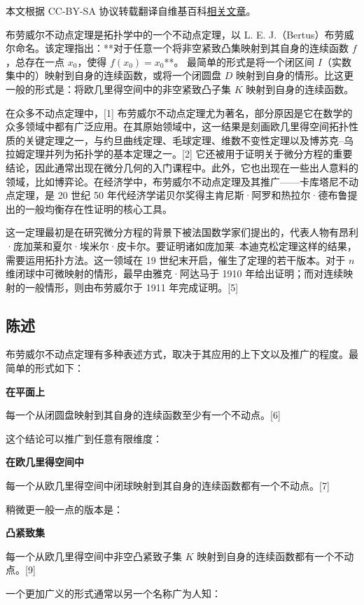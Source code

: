 
本文根据 CC-BY-SA 协议转载翻译自维基百科\href{https://en.wikipedia.org/wiki/Brouwer_fixed-point_theorem}{相关文章}。

布劳威尔不动点定理是拓扑学中的一个不动点定理，以 L. E. J.（Bertus）布劳威尔命名。该定理指出：**对于任意一个将非空紧致凸集映射到其自身的连续函数 $f$，总存在一点 $x_0$，使得 $f(x_0) = x_0$**。
最简单的形式是将一个闭区间 $I$（实数集中的）映射到自身的连续函数，或将一个闭圆盘 $D$ 映射到自身的情形。比这更一般的形式是：将欧几里得空间中的非空紧致凸子集 $K$ 映射到自身的连续函数。

在众多不动点定理中，[1] 布劳威尔不动点定理尤为著名，部分原因是它在数学的众多领域中都有广泛应用。在其原始领域中，这一结果是刻画欧几里得空间拓扑性质的关键定理之一，与约旦曲线定理、毛球定理、维数不变性定理以及博苏克–乌拉姆定理并列为拓扑学的基本定理之一。[2] 它还被用于证明关于微分方程的重要结论，因此通常出现在微分几何的入门课程中。此外，它也出现在一些出人意料的领域，比如博弈论。在经济学中，布劳威尔不动点定理及其推广——卡库塔尼不动点定理，是 20 世纪 50 年代经济学诺贝尔奖得主肯尼斯·阿罗和热拉尔·德布鲁提出的一般均衡存在性证明的核心工具。

这一定理最初是在研究微分方程的背景下被法国数学家们提出的，代表人物有昂利·庞加莱和夏尔·埃米尔·皮卡尔。要证明诸如庞加莱–本迪克松定理这样的结果，需要运用拓扑方法。这一领域在 19 世纪末开启，催生了定理的若干版本。对于 $n$ 维闭球中可微映射的情形，最早由雅克·阿达马于 1910 年给出证明；而对连续映射的一般情形，则由布劳威尔于 1911 年完成证明。[5]
\subsection{陈述}
布劳威尔不动点定理有多种表述方式，取决于其应用的上下文以及推广的程度。最简单的形式如下：

\textbf{在平面上}

每一个从闭圆盘映射到其自身的连续函数至少有一个不动点。[6]

这个结论可以推广到任意有限维度：

\textbf{在欧几里得空间中}

每一个从欧几里得空间中闭球映射到其自身的连续函数都有一个不动点。[7]

稍微更一般一点的版本是：

\textbf{凸紧致集}

每一个从欧几里得空间中非空凸紧致子集 $K$ 映射到自身的连续函数都有一个不动点。[9]

一个更加广义的形式通常以另一个名称广为人知：


